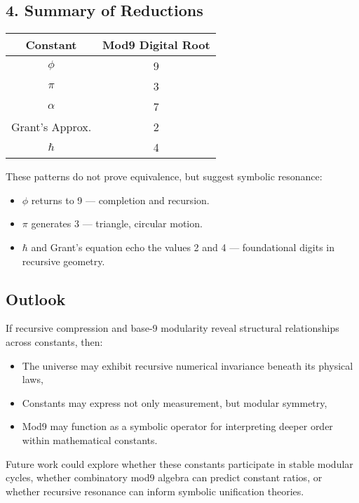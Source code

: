 \documentclass[12pt]{article}
\begin{document}
\subsection*{4. Summary of Reductions}

\begin{center}
\begin{tabular}{|c|c|}
\hline
\textbf{Constant} & \textbf{Mod9 Digital Root} \\
\hline
\(\phi\) & 9 \\
\(\pi\) & 3 \\
\(\alpha\) & 7 \\
Grant’s Approx. & 2 \\
\(\hbar\) & 4 \\
\hline
\end{tabular}
\end{center}

These patterns do not prove equivalence, but suggest symbolic resonance:
\begin{itemize}[leftmargin=1.5em]
    \item \(\phi\) returns to 9 — completion and recursion.
    \item \(\pi\) generates 3 — triangle, circular motion.
    \item \(\hbar\) and Grant’s equation echo the values 2 and 4 — foundational digits in recursive geometry.
\end{itemize}

\subsection*{Outlook}

If recursive compression and base-9 modularity reveal structural relationships across constants, then:
\begin{itemize}[leftmargin=1.5em]
    \item The universe may exhibit recursive numerical invariance beneath its physical laws,
    \item Constants may express not only measurement, but modular symmetry,
    \item Mod9 may function as a symbolic operator for interpreting deeper order within mathematical constants.
\end{itemize}

Future work could explore whether these constants participate in stable modular cycles, whether combinatory mod9 algebra can predict constant ratios, or whether recursive resonance can inform symbolic unification theories.
\end{document}
